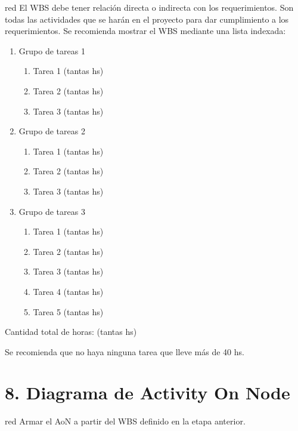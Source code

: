 \documentclass[
11pt, %
]{charter}
\begin{document}
\begin{consigna}{red}
El WBS debe tener relación directa o indirecta con los requerimientos.  Son todas las actividades que se harán en el proyecto para dar cumplimiento a los requerimientos. Se recomienda mostrar el WBS mediante una lista indexada:

\begin{enumerate}
\item Grupo de tareas 1
	\begin{enumerate}
	\item Tarea 1 (tantas hs)
	\item Tarea 2 (tantas hs)
	\item Tarea 3 (tantas hs)
	\end{enumerate}
\item Grupo de tareas 2
	\begin{enumerate}
	\item Tarea 1 (tantas hs)
	\item Tarea 2 (tantas hs)
	\item Tarea 3 (tantas hs)
	\end{enumerate}
\item Grupo de tareas 3
	\begin{enumerate}
	\item Tarea 1 (tantas hs)
	\item Tarea 2 (tantas hs)
	\item Tarea 3 (tantas hs)
	\item Tarea 4 (tantas hs)
	\item Tarea 5 (tantas hs)
	\end{enumerate}
\end{enumerate}

Cantidad total de horas: (tantas hs)

Se recomienda que no haya ninguna tarea que lleve más de 40 hs. 

\end{consigna}

\section{8. Diagrama de Activity On Node}
\label{sec:AoN}

\begin{consigna}{red}
Armar el AoN a partir del WBS definido en la etapa anterior. 



\end{consigna}
\end{document}
